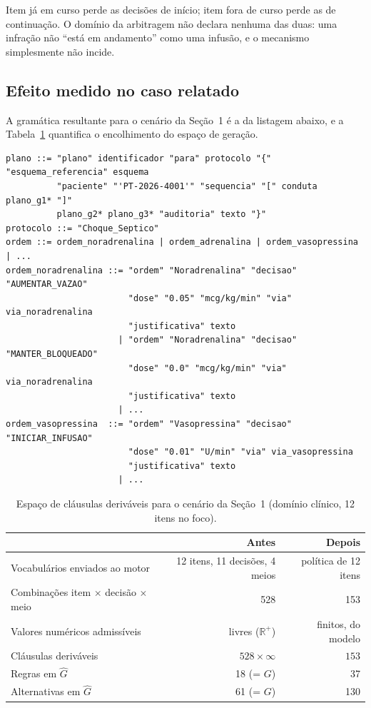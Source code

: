 \documentclass[11pt,a4paper]{article}
\begin{document}
Item já em curso perde as decisões de início; item fora de curso perde as de
continuação. O domínio da arbitragem não declara nenhuma das duas: uma infração
não ``está em andamento'' como uma infusão, e o mecanismo simplesmente não
incide.

\subsection{Efeito medido no caso relatado}

A gramática resultante para o cenário da Seção~1 é a da listagem abaixo, e a
Tabela~\ref{tab:espaco} quantifica o encolhimento do espaço de geração.

\begin{lstlisting}[language=bnf,caption={Trecho de $\hat{G}$ especializada para o cenário da Seção~1.}]
plano ::= "plano" identificador "para" protocolo "{" "esquema_referencia" esquema
          "paciente" "'PT-2026-4001'" "sequencia" "[" conduta plano_g1* "]"
          plano_g2* plano_g3* "auditoria" texto "}"
protocolo ::= "Choque_Septico"
ordem ::= ordem_noradrenalina | ordem_adrenalina | ordem_vasopressina | ...
ordem_noradrenalina ::= "ordem" "Noradrenalina" "decisao" "AUMENTAR_VAZAO"
                        "dose" "0.05" "mcg/kg/min" "via" via_noradrenalina
                        "justificativa" texto
                      | "ordem" "Noradrenalina" "decisao" "MANTER_BLOQUEADO"
                        "dose" "0.0" "mcg/kg/min" "via" via_noradrenalina
                        "justificativa" texto
                      | ...
ordem_vasopressina  ::= "ordem" "Vasopressina" "decisao" "INICIAR_INFUSAO"
                        "dose" "0.01" "U/min" "via" via_vasopressina
                        "justificativa" texto
                      | ...
\end{lstlisting}

\begin{table}[h]
\centering
\small
\caption{Espaço de cláusulas deriváveis para o cenário da Seção~1 (domínio clínico,
12 itens no foco).}
\label{tab:espaco}
\begin{tabular}{@{}lrr@{}}
\toprule
& \textbf{Antes} & \textbf{Depois} \\
\midrule
Vocabulários enviados ao motor & 12 itens, 11 decisões, 4 meios & política de 12 itens \\
Combinações item $\times$ decisão $\times$ meio & 528 & 153 \\
Valores numéricos admissíveis & livres ($\mathbb{R}^{+}$) & finitos, do modelo \\
Cláusulas deriváveis & $528 \times \infty$ & $153$ \\
Regras em $\hat{G}$ & 18 (= $G$) & 37 \\
Alternativas em $\hat{G}$ & 61 (= $G$) & 130 \\
\bottomrule
\end{tabular}
\end{table}
\end{document}
